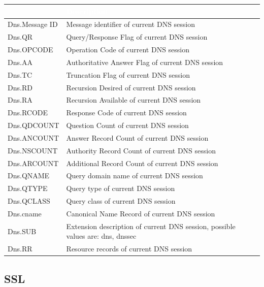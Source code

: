 \begin{longtable}{p{}|p{}}   
    \rowcolor{black}\multicolumn{1}{l!\vlinewhite}{\textcolor{white}{Field}}  & \textcolor{white}{Description} \\\hline
    Dns.Message ID &	Message identifier of current DNS session \\\hline
    Dns.QR &	Query/Response Flag of current DNS session \\\hline
    Dns.OPCODE &	Operation Code of current DNS session \\\hline
    Dns.AA &	Authoritative Answer Flag of current DNS session \\\hline
    Dns.TC &	Truncation Flag of current DNS session \\\hline
    Dns.RD &	Recursion Desired of current DNS session \\\hline
    Dns.RA &	Recursion Available of current DNS session \\\hline
    Dns.RCODE &	Response Code of current DNS session \\\hline
    Dns.QDCOUNT &	Question Count of current DNS session \\\hline
    Dns.ANCOUNT &	Answer Record Count of current DNS session \\\hline
    Dns.NSCOUNT &	Authority Record Count of current DNS session \\\hline
    Dns.ARCOUNT &	Additional Record Count of current DNS session \\\hline
    Dns.QNAME &	Query domain name of current DNS session \\\hline
    Dns.QTYPE &	Query type of current DNS session \\\hline
    Dns.QCLASS &	Query class of current DNS session \\\hline
    Dns.cname &	Canonical Name Record of current DNS session \\\hline
    Dns.SUB &	Extension description of current DNS session, possible values are: dns, dnssec \\\hline
    Dns.RR &	Resource records of current DNS session \\\hline    
\end{longtable}

\subsection*{\hypertarget{link:SSL}{SSL}}
\label{sec:appendix_c:protocol:SSL}

